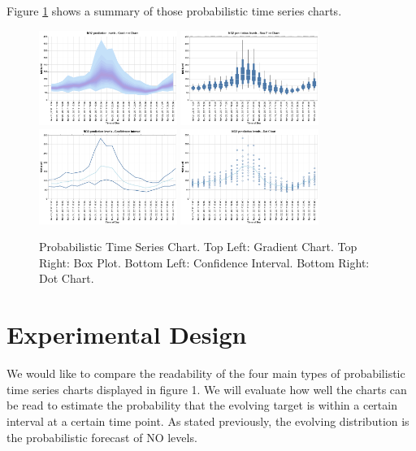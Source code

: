 \documentclass[a4paper,3p,sort&compress]{elsarticle}
\begin{document}
Figure \ref{figure:charts} shows a summary of those probabilistic time series charts.

\begin{figure}
  \centering
  \includegraphics[width=0.4\textwidth]{gradient} 
  \includegraphics[width=0.4\textwidth]{boxplot}
  \includegraphics[width=0.4\textwidth]{ci} 
  \includegraphics[width=0.4\textwidth]{dot}
  \caption{\label{figure:charts} Probabilistic Time Series Chart. 
  Top Left: Gradient Chart. Top Right: Box Plot. 
  Bottom Left: Confidence Interval. Bottom Right: Dot Chart.  }
\end{figure}

\section{Experimental Design}
\label{sec:exp_design}

We would like to compare the readability of the four main types of probabilistic time series charts 
displayed in figure 1. We will evaluate how well the charts can be read to estimate the probability 
that the evolving target is within a certain interval at a certain time point. As stated previously, 
the evolving distribution is the probabilistic forecast of NO levels. 
\end{document}
